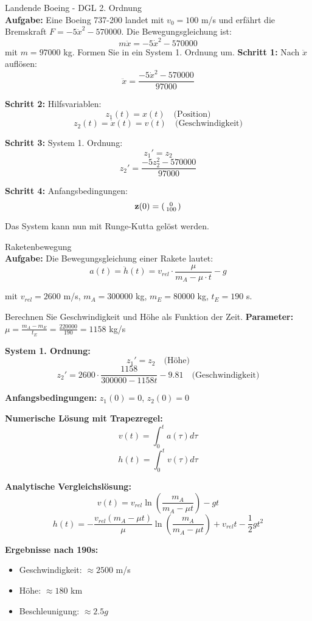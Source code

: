 \begin{example2}{Landende Boeing - DGL 2. Ordnung}\\
\textbf{Aufgabe:} Eine Boeing 737-200 landet mit $v_0 = 100$ m/s und erfährt die Bremskraft $F = -5\dot{x}^2 - 570000$. Die Bewegungsgleichung ist:
$$m\ddot{x} = -5\dot{x}^2 - 570000$$
mit $m = 97000$ kg. Formen Sie in ein System 1. Ordnung um.
\tcblower
\textbf{Schritt 1:} Nach $\ddot{x}$ auflösen:
$$\ddot{x} = \frac{-5\dot{x}^2 - 570000}{97000}$$

\textbf{Schritt 2:} Hilfsvariablen:
$$z_1(t) = x(t) \quad \text{(Position)}$$
$$z_2(t) = \dot{x}(t) = v(t) \quad \text{(Geschwindigkeit)}$$

\textbf{Schritt 3:} System 1. Ordnung:
$$z_1' = z_2$$
$$z_2' = \frac{-5z_2^2 - 570000}{97000}$$

\textbf{Schritt 4:} Anfangsbedingungen:
$$\mathbf{z}(0) = \begin{psmallmatrix} 0 \\ 100 \end{psmallmatrix}$$

Das System kann nun mit Runge-Kutta gelöst werden.
\end{example2}

\begin{example2}{Raketenbewegung}\\
\textbf{Aufgabe:} Die Bewegungsgleichung einer Rakete lautet:
$$a(t) = \ddot{h}(t) = v_{rel} \cdot \frac{\mu}{m_A - \mu \cdot t} - g$$

mit $v_{rel} = 2600$ m/s, $m_A = 300000$ kg, $m_E = 80000$ kg, $t_E = 190$ s.

Berechnen Sie Geschwindigkeit und Höhe als Funktion der Zeit.
\tcblower
\textbf{Parameter:} $\mu = \frac{m_A - m_E}{t_E} = \frac{220000}{190} = 1158$ kg/s

\textbf{System 1. Ordnung:}
$$z_1' = z_2 \quad \text{(Höhe)}$$
$$z_2' = 2600 \cdot \frac{1158}{300000 - 1158t} - 9.81 \quad \text{(Geschwindigkeit)}$$

\textbf{Anfangsbedingungen:} $z_1(0) = 0$, $z_2(0) = 0$

\textbf{Numerische Lösung mit Trapezregel:}
$$v(t) = \int_0^t a(\tau) d\tau$$
$$h(t) = \int_0^t v(\tau) d\tau$$

\textbf{Analytische Vergleichslösung:}
$$v(t) = v_{rel} \ln\left(\frac{m_A}{m_A - \mu t}\right) - gt$$
$$h(t) = -\frac{v_{rel}(m_A - \mu t)}{\mu} \ln\left(\frac{m_A}{m_A - \mu t}\right) + v_{rel} t - \frac{1}{2}gt^2$$

\textbf{Ergebnisse nach 190s:}
\begin{itemize}
    \item Geschwindigkeit: $\approx 2500$ m/s
    \item Höhe: $\approx 180$ km
    \item Beschleunigung: $\approx 2.5g$
\end{itemize}
\end{example2}


